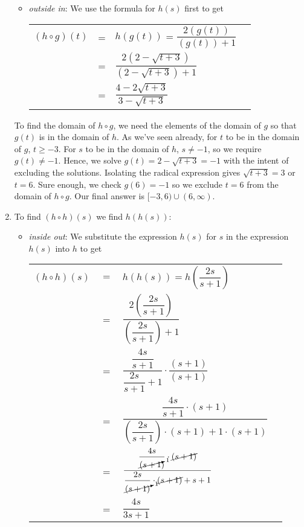 \documentclass{ximera}
\begin{document}
\begin{ex}
\begin{enumerate}
\begin{itemize}
\item  \textit{outside in}:  We use the formula for $h(s)$ first to get
\begin{longtable}{rclr} $(h \circ g)(t)$ & = & $h(g(t))$ = $\dfrac{2 \left(g(t)\right)}{\left( g(t)\right) + 1}$ & \\ [12pt]
 & = & $\dfrac{2 \left(2-\sqrt{t+3} \right)}{\left(2-\sqrt{t+3}\right)+1}$ & \\[12pt] 
 & = & $\dfrac{4-2\sqrt{t+3}}{3-\sqrt{t+3}}$ & \\
  \end{longtable}
 
 \end{itemize}

To find the domain of $h \circ g$, we need the elements of the domain of $g$ so that $g(t)$ is in the domain of $h$.  As we've seen already, for $t$ to be in the domain of $g$, $t \geq -3$. For $s$ to be in the domain of $h$, $s \neq -1$, so we require $g(t) \neq -1$.  Hence, we solve $g(t) = 2-\sqrt{t+3} = -1$ with the intent of excluding the solutions. Isolating the radical expression gives $\sqrt{t+3} = 3$ or $t = 6$.  Sure enough, we check $g(6)=-1$ so we exclude $t=6$ from the domain of $h \circ g$.  Our final answer is $[-3, 6) \cup (6, \infty)$.


\item  To find $(h \circ h)(s)$ we find $h(h(s))$:

\begin{itemize}

\item  \textit{inside out}: We substitute the expression $h(s)$ for $s$ in the expression $h(s)$ into $h$ to get
\begin{longtable}{rclr} $(h \circ h)(s)$ & $=$ & $h(h(s)) =h\left(\dfrac{2s}{s+1}\right)$ & \\ [15pt]
&=& $\dfrac{2\left(\dfrac{2s}{s+1}\right)}{\left(\dfrac{2s}{s+1}\right)+1}$ & \\ [25pt]
 & = & $\dfrac{\dfrac{4s}{s+1}}{\dfrac{2s}{s+1}+1} \cdot \dfrac{(s+1)}{(s+1)}$ & \\ [25pt]
& = & $\dfrac{\dfrac{4s}{s+1} \cdot (s+1)}{\left(\dfrac{2s}{s+1}\right)\cdot(s+1)+1\cdot(s+1)}$ & \\ [25pt]
& = & $\dfrac{\dfrac{4s}{\cancelto{1}{(s+1})} \cdot \cancel{(s+1)}}{\dfrac{2s}{\cancelto{1}{(s+1)}}\cdot\cancel{(s+1)}+s+1}$ & \\ [25pt]
& = & $\dfrac{4s}{3s+1}$ & \\ 
 \end{longtable}


\end{itemize}
\end{enumerate}
\end{ex}
\end{document}
